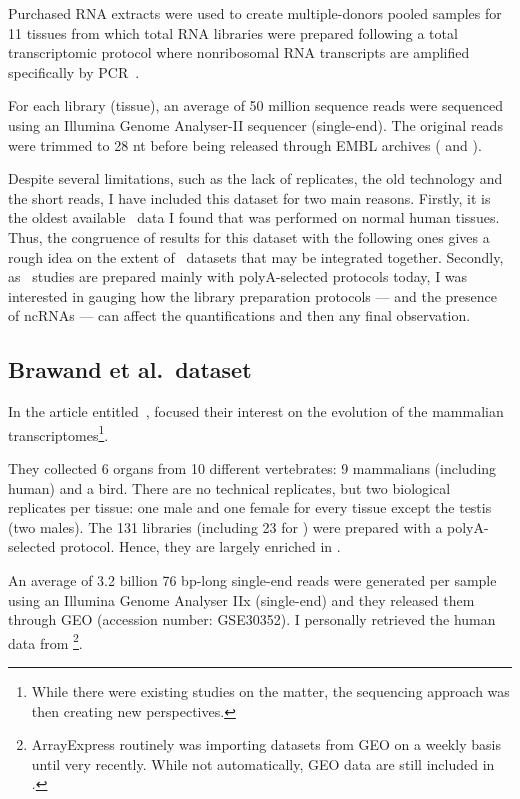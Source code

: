 Purchased \gls{RNA} extracts were used to create multiple-donors pooled
samples for 11 tissues from which total \gls{RNA} libraries were prepared
following a total transcriptomic protocol
where nonribosomal \gls{RNA} transcripts are
amplified specifically by \gls{PCR}~.\mybr\

For each library (tissue), an average of 50 million sequence reads were sequenced
using an Illumina Genome Analyser-II sequencer (single-end).
The original reads were trimmed to 28 \gls{nt}
before being released through EMBL archives (
and ).\mybr\

Despite several limitations, such as the lack of replicates, the old technology and
the short reads,
I have included this dataset for two main reasons.
Firstly, it is the oldest available
\Rnaseq\ data I found that was performed on normal human tissues.
Thus, the congruence of results for this dataset with the following ones
gives a rough idea on the extent of \Rnaseq\ datasets
that may be integrated together.
Secondly, as \Rnaseq\ studies are prepared mainly with polyA-selected protocols
today, I was interested in gauging how the library preparation
protocols --- and the presence of \glspl{ncRNA} --- can affect the
quantifications and then any final observation.\mybr\


\subsection{Brawand et al.\ dataset}\label{subsec:brawandpresentation}
\vspace*{-0.2in}
In the article entitled~,
\citet{VTpaper} focused their interest on the
evolution of the mammalian transcriptomes\footnote{While there were existing
studies on the matter, the sequencing approach was then creating new perspectives.}.\mybr\

They collected 6 organs from 10 different vertebrates:
9 mammalians (including human) and a bird. There are no technical replicates,
but  two biological replicates per tissue:
one male and one female for every tissue except the testis (two males).
The 131 libraries (including 23 for ) were prepared with
a polyA-selected protocol.
Hence, they are largely enriched in \pcgs.\mybr\

An average of 3.2 billion 76 \gls{bp}-long single-end reads were generated per sample
using an Illumina Genome Analyser IIx (single-end) and they released them
through \gls{GEO} (accession number: GSE30352).
I personally retrieved the human data from
\footnote{ArrayExpress routinely was importing
datasets from \gls{GEO} on a weekly basis until very recently.
While not automatically, \gls{GEO} data are still included in \egxa.}.\mybr\


